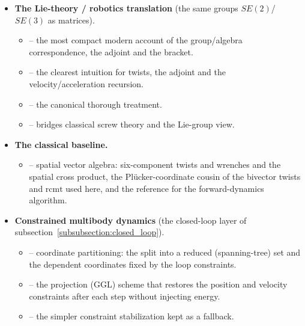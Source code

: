 {\begin{itemize}
\begin{itemize}
              projective geometric algebra.
    \end{itemize}
    \item \textbf{The Lie-theory / robotics translation} (the same groups $SE(2)$/$SE(3)$
          as matrices).
    \begin{itemize}
        \item \cite{Sola_micro_lie_theory:2018} -- the most compact modern account of the
              group/algebra correspondence, the adjoint and the bracket.
        \item \cite{Lynch_Park_modern_robotics:2017} -- the clearest intuition for twists,
              the adjoint and the velocity/acceleration recursion.
        \item \cite{Murray_Li_Sastry_robotic_manipulation:1994} -- the canonical thorough
              treatment.
        \item \cite{Selig_geometric_fundamentals_robotics:2005} -- bridges classical screw
              theory and the Lie-group view.
    \end{itemize}
    \item \textbf{The classical baseline.}
    \begin{itemize}
        \item \cite{Featherstone_rigid_body_dynamics:2008} -- spatial vector algebra:
              six-component twists and wrenches and the spatial cross product, the
              Pl\"ucker-coordinate cousin of the bivector twists and $\mathrm{rcmt}$ used
              here, and the reference for the forward-dynamics algorithm.
    \end{itemize}
    \item \textbf{Constrained multibody dynamics} (the closed-loop layer of
          subsection~\ref{subsubsection:closed_loop}).
    \begin{itemize}
        \item \cite{Wehage_Haug_coordinate_partitioning:1982} -- coordinate partitioning:
              the split into a reduced (spanning-tree) set and the dependent coordinates
              fixed by the loop constraints.
        \item \cite{Gear_Gupta_Leimkuhler_constrained_integration:1985} -- the
              projection (GGL) scheme that restores the position and velocity constraints
              after each step without injecting energy.
        \item \cite{Baumgarte_constraint_stabilization:1972} -- the simpler constraint
              stabilization kept as a fallback.
    \end{itemize}
\end{itemize}
}
\newpage